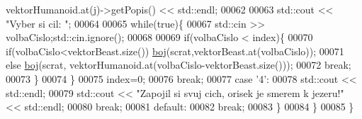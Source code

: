 \begin{DoxyCode}
      vektorHumanoid.at(j)->getPopis() << std::endl;
00062 
00063                     std::cout << \textcolor{stringliteral}{"Vyber si cil: "};
00064 
00065                     \textcolor{keywordflow}{while}(\textcolor{keyword}{true})\{
00067                         std::cin >> volbaCislo;std::cin.ignore();
00068 
00069                         \textcolor{keywordflow}{if}(volbaCislo < index)\{
00070                             \textcolor{keywordflow}{if}(volbaCislo<vektorBeast.size()) \hyperlink{namespaceIceAge_a2c6b97286bcd54e3ecf2fdc335460e90}{boj}(scrat,vektorBeast.at(volbaCislo));
00071                             \textcolor{keywordflow}{else} \hyperlink{namespaceIceAge_a2c6b97286bcd54e3ecf2fdc335460e90}{boj}(scrat, vektorHumanoid.at(volbaCislo-vektorBeast.size()));
00072                             \textcolor{keywordflow}{break};
00073                         \}
00074                     \}
00075                     index=0;
00076                     \textcolor{keywordflow}{break};
00077                 \textcolor{keywordflow}{case} \textcolor{charliteral}{'4'}:
00078                     std::cout << std::endl;
00079                     std::cout << \textcolor{stringliteral}{"Zapojil si svuj cich, orisek je smerem k jezeru!"} << std::endl;
00080                     \textcolor{keywordflow}{break};
00081                 \textcolor{keywordflow}{default}:
00082                     \textcolor{keywordflow}{break};
00083             \}
00084         \}
00085 \}
\end{DoxyCode}
